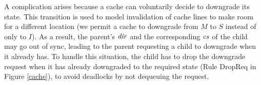 A complication arises because a cache can voluntarily decide to downgrade its
state.  This transition is used to model invalidation of cache lines to make
room for a different location (we permit a cache to downgrade from $M$ to $S$
instead of only to $I$).
As a result, the parent's $\mathit{dir}$ and the
corresponding $\mathit{cs}$ of the child may go out of sync, leading to the parent
requesting a child to downgrade when it already has. To handle this situation,
the child has to drop the downgrade request when it has already downgraded to
the required state (Rule DropReq in Figure \ref{cache}), to avoid deadlocks
by not dequeuing the request.




